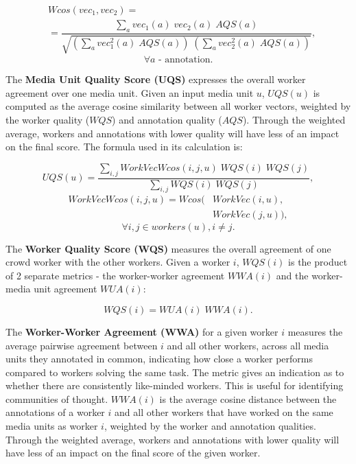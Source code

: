 \begin{align*}
& Wcos(vec_1, vec_2) = \\
& = \dfrac{\sum_{a} vec_1(a) \; vec_2(a) \; AQS(a)}{\sqrt{(\sum_{a} vec_1^2(a) \; AQS(a)) \; (\sum_{a} vec_2^2(a) \; AQS(a))}},
\end{align*}
$$\forall a \text{ - annotation}.$$

The \textbf{Media Unit Quality Score (UQS)} expresses the overall worker agreement over one media unit. Given an input media unit $u$, $UQS(u)$ is computed as the average cosine similarity between all worker vectors, weighted by the worker quality ($WQS$) and annotation quality ($AQS$). Through the weighted average, workers and annotations with lower quality will have less of an impact on the final score. The formula used in its calculation is:

$$ UQS(u) = \dfrac{\sum\limits_{i, j} WorkVecWcos(i, j, u) \; WQS(i) \; WQS(j)}{\sum\limits_{i,j} WQS(i) \; WQS(j)}, $$
\begin{align*}
WorkVecWcos(i, j, u) = Wcos(&WorkVec(i, u), \\
                            &WorkVec(j, u)),
\end{align*}
$$\forall i, j \in workers(u), i \neq j.$$

The \textbf{Worker Quality Score (WQS)} measures the overall agreement of one crowd worker with the other workers. Given a worker $i$, $WQS(i)$ is the product of 2 separate metrics - the worker-worker agreement $WWA(i)$ and the worker-media unit agreement $WUA(i)$:

$$ WQS(i) = WUA(i) \; WWA(i) .$$

The \textbf{Worker-Worker Agreement (WWA)} for a given worker $i$ measures the average pairwise agreement between $i$ and all other workers, across all media units they annotated in common, indicating how close a worker performs compared to workers solving the same task.  The metric gives an indication as to whether there are consistently like-minded workers. This is useful for identifying communities of thought. $WWA(i)$ is the average cosine distance between the annotations of a worker $i$ and all other workers that have worked on the same media units as worker $i$, weighted by the worker and annotation qualities. Through the weighted average, workers and annotations with lower quality will have less of an impact on the final score of the given worker.

